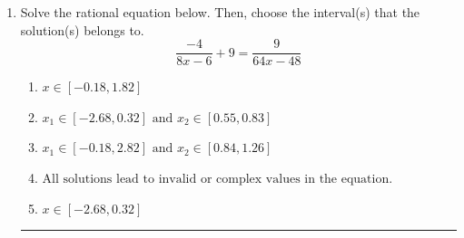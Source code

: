 \documentclass[14pt]{extbook}
\newcommand{\litem}[1]{\item#1\hspace*{-1cm}\rule{\textwidth}{0.4pt}}
\begin{document}
\begin{enumerate}
{\begin{enumerate}[label=\Alph*.]
\end{enumerate} }
\litem{
Solve the rational equation below. Then, choose the interval(s) that the solution(s) belongs to.\[ \frac{-4}{8x -6} + 9 = \frac{9}{64x -48} \]\begin{enumerate}[label=\Alph*.]
\item \( x \in [-0.18,1.82] \)
\item \( x_1 \in [-2.68, 0.32] \text{ and } x_2 \in [0.55,0.83] \)
\item \( x_1 \in [-0.18, 2.82] \text{ and } x_2 \in [0.84,1.26] \)
\item \( \text{All solutions lead to invalid or complex values in the equation.} \)
\item \( x \in [-2.68,0.32] \)

\end{enumerate} }
\end{enumerate}
\end{document}

